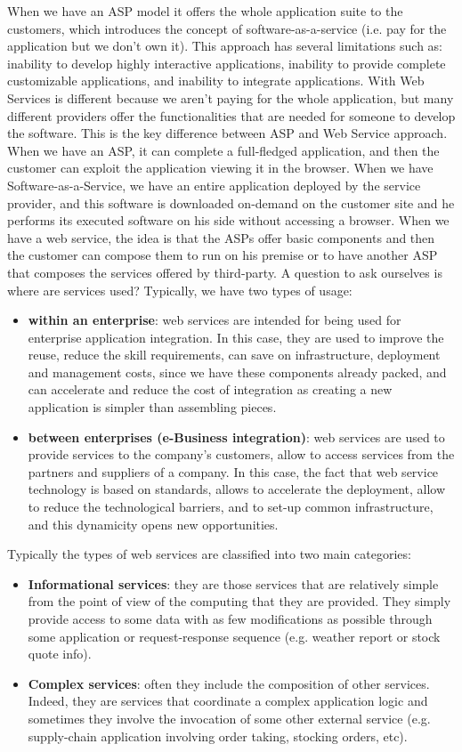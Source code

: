 When we have an ASP model it offers the whole application suite to the customers, which introduces the concept of software-as-a-service (i.e. pay for the application but we don't own it).
This approach has several limitations such as: inability to develop highly interactive applications, inability to provide complete customizable applications, and inability to integrate applications.
With Web Services is different because we aren't paying for the whole application, but many different providers offer the functionalities that are needed for someone to develop the software.
This is the key difference between ASP and Web Service approach.
When we have an ASP, it can complete a full-fledged application, and then the customer can exploit the application viewing it in the browser.
When we have Software-as-a-Service, we have an entire application deployed by the service provider, and this software is downloaded on-demand on the customer site and he performs its executed software on his side without accessing a browser.
When we have a web service, the idea is that the ASPs offer basic components and then the customer can compose them to run on his premise or to have another ASP that composes the services offered by third-party.
A question to ask ourselves is where are services used?
Typically, we have two types of usage:
\begin{itemize}
    \item \textbf{within an enterprise}: web services are intended for being used for enterprise application integration. In this case, they are used to improve the reuse, reduce the skill requirements, can save on infrastructure, deployment and management costs, since we have these components already packed, and can accelerate and reduce the cost of integration as creating a new application is simpler than assembling pieces.
    \item \textbf{between enterprises (e-Business integration)}: web services are used to provide services to the company's customers, allow to access services from the partners and suppliers of a company. In this case, the fact that web service technology is based on standards, allows to accelerate the deployment, allow to reduce the technological barriers, and to set-up common infrastructure, and this dynamicity opens new opportunities.
\end{itemize}
Typically the types of web services are classified into two main categories:
\begin{itemize}
    \item \textbf{Informational services}: they are those services that are relatively simple from the point of view of the computing that they are provided. They simply provide access to some data with as few modifications as possible through some application or request-response sequence (e.g. weather report or stock quote info).
    \item \textbf{Complex services}: often they include the composition of other services. Indeed, they are services that coordinate a complex application logic and sometimes they involve the invocation of some other external service (e.g. supply-chain application involving order taking, stocking orders, etc).
\end{itemize}
